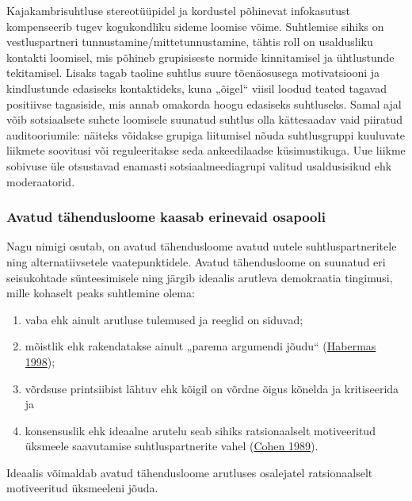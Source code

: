 \documentclass[estonian,]{article}
\begin{document}
Kajakambrisuhtluse stereotüüpidel ja kordustel põhinevat infokasutust kompenseerib tugev kogukondliku sideme loomise võime. Suhtlemise sihiks on vestluspartneri tunnustamine/mittetunnustamine, tähtis roll on usaldusliku kontakti loomisel, mis põhineb grupisiseste normide kinnitamisel ja ühtlustunde tekitamisel. Lisaks tagab taoline suhtlus suure tõenäosusega motivatsiooni ja kindlustunde edasiseks kontaktideks, kuna „õigel`` viisil loodud teated tagavad positiivse tagasiside, mis annab omakorda hoogu edasiseks suhtluseks. Samal ajal võib sotsiaalsete suhete loomisele suunatud suhtlus olla kättesaadav vaid piiratud auditooriumile: näiteks võidakse grupiga liitumisel nõuda suhtlusgruppi kuuluvate liikmete soovitusi või reguleeritakse seda ankeedilaadse küsimustikuga. Uue liikme sobivuse üle otsustavad enamasti sotsiaalmeediagrupi valitud usaldusisikud ehk moderaatorid.

\hypertarget{avatud-tuxe4hendusloome-kaasab-erinevaid-osapooli}{%
\subsubsection*{Avatud tähendusloome kaasab erinevaid osapooli}\label{avatud-tuxe4hendusloome-kaasab-erinevaid-osapooli}}

Nagu nimigi osutab, on avatud tähendusloome avatud uutele suhtluspartneritele ning alternatiivsetele vaatepunktidele. Avatud tähendusloome on suunatud eri seisukohtade sünteesimisele ning järgib ideaalis arutleva demokraatia tingimusi, mille kohaselt peaks suhtlemine olema:

\begin{enumerate}
\def\labelenumi{\arabic{enumi})}
\item
  vaba ehk ainult arutluse tulemused ja reeglid on siduvad;
\item
  mõistlik ehk rakendatakse ainult „parema argumendi jõudu`` (\protect\hyperlink{Habermas1998}{Habermas 1998});
\item
  võrdsuse printsiibist lähtuv ehk kõigil on võrdne õigus kõnelda ja kritiseerida ja
\item
  konsensuslik ehk ideaalne arutelu seab sihiks ratsionaalselt motiveeritud üksmeele saavutamise suhtluspartnerite vahel (\protect\hyperlink{Cohen1989}{Cohen 1989}).
\end{enumerate}

\begin{blockquote-right}
Ideaalis võimaldab avatud tähendusloome arutluses osalejatel
ratsionaalselt motiveeritud üksmeeleni jõuda.
\end{blockquote-right}
\end{document}
